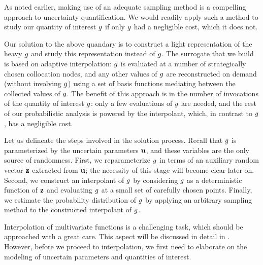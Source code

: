 As noted earlier, making use of an adequate sampling method is a compelling
approach to uncertainty quantification. We would readily apply such a method to
study our quantity of interest $g$ if only $g$ had a negligible cost, which it
does not.

Our solution to the above quandary is to construct a light representation of the
heavy $g$ and study this representation instead of $g$. The surrogate that we
build is based on adaptive interpolation: $g$ is evaluated at a number of
strategically chosen collocation nodes, and any other values of $g$ are
reconstructed on demand (without involving $g$) using a set of basis functions
mediating between the collected values of $g$. The benefit of this approach is
in the number of invocations of the quantity of interest $g$: only a few
evaluations of $g$ are needed, and the rest of our probabilistic analysis is
powered by the interpolant, which, in contrast to $g$, has a negligible cost.

Let us delineate the steps involved in the solution process. Recall that $g$ is
parameterized by the uncertain parameters $\mathbf{u}$, and these variables are the
only source of randomness. First, we reparameterize $g$ in terms of an
auxiliary random vector $\mathbf{z}$ extracted from $\mathbf{u}$; the necessity of this stage
will become clear later on. Second, we construct an interpolant of $g$ by
considering $g$ as a deterministic function of $\mathbf{z}$ and evaluating $g$ at a
small set of carefully chosen points. Finally, we estimate the probability
distribution of $g$ by applying an arbitrary sampling method to the constructed
interpolant of $g$.

Interpolation of multivariate functions is a challenging task, which should be
approached with a great care. This aspect will be discussed in detail in
. However, before we proceed to interpolation, we first need
to elaborate on the modeling of uncertain parameters and quantities of interest.
